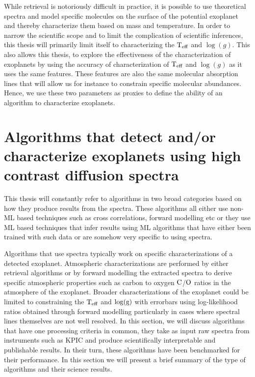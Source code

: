 While retrieval is notoriously difficult in practice, it is possible to use theoretical spectra and model specific molecules on the surface of the potential exoplanet and thereby characterize them based on mass and temperature.
In order to narrow the scientific scope and to limit the complication of scientific inferences, this thesis will primarily limit itself to characterizing the $\rm{T_{eff}}$ and $\log(g)$.
This also allows this thesis, to explore the effectiveness of the characterization of exoplanets by using the accuracy of characterization of $\rm{T_{eff}}$ and $\log(g)$ as it uses the same features.
These features are also the same molecular absorption lines that will allow us for instance to constrain specific molecular abundances.
Hence, we use these two parameters as proxies to define the ability of an algorithm to characterize exoplanets.
\section{Algorithms that detect and/or characterize exoplanets using high contrast diffusion spectra }
This thesis will constantly refer to algorithms in two broad categories based on how they produce results from the spectra.
These algorithms all either use non-ML based techniques such as cross correlations, forward modelling etc or they use ML based techniques that infer results using ML algorithms that have either been trained with such data or are somehow very specific to using spectra.

Algorithms that use spectra typically work on specific characterizations of a detected exoplanet. 
Atmospheric characterizations are performed by either retrieval algorithms \citep[e.g][]{2017Lavie} or by forward modelling \citep[e.g][]{2023PalmaBifani} the extracted spectra to derive specific atmospheric properties such as carbon to oxygen $\rm{C}$/$\rm{O}$ ratios in the atmosphere of the exoplanet.
Broader characterizations of the exoplanet could be limited to constraining the $\rm{T_{eff}}$ and $\rm{\log(g)}$ with errorbars using log-likelihood ratios obtained through forward modelling \citep[e.g][]{ruffio2019radial} particularly in cases where spectral lines themselves are not well resolved.
In this section, we will discuss algorithms that have one processing criteria in common, they take as input raw spectra from instruments such as KPIC and produce scientifically interpretable and publishable results.
In their turn, these algorithms have been benchmarked for their performance.
In this section we will present a brief summary of the type of algorithms and their science results.


